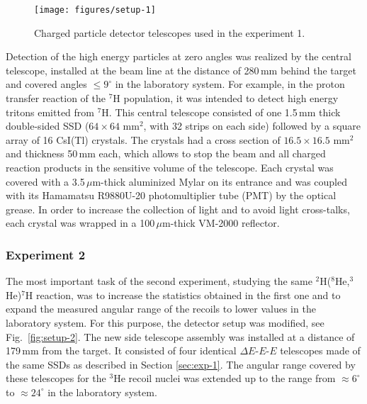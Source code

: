 \begin{figure}
	\begin{center}
		\texttt{[image: figures/setup-1]}
	\end{center}
	\caption{Charged particle detector telescopes used in the experiment 1.}
	\label{fig:setup-1}
\end{figure}

Detection of the high energy particles at zero angles was realized by the central telescope, installed at the beam line at the distance of 280\,mm behind the target and covered angles $\leq9^{\circ}$ in the laboratory system.
For example, in the proton transfer reaction of the $^7$H population, it was intended to detect high energy tritons emitted from $^7$H.
This central telescope consisted of one 1.5\,mm thick double-sided SSD ($64 \times 64$ mm$^2$, with 32 strips on each side) followed by a square array of 16 CsI(Tl) crystals.
The crystals had a cross section of $16.5\times16.5$ mm$^2$ and thickness 50\,mm each, which allows to stop the beam and all charged reaction products in the sensitive volume of the telescope.
Each crystal was covered with a 3.5\,$\mu$m-thick aluminized Mylar on its entrance and was coupled with its Hamamatsu R9880U-20 photomultiplier tube (PMT) by the optical grease.
In order to increase the collection of light and to avoid light cross-talks, each crystal was wrapped in a 100\,$\mu$m-thick VM-2000 reflector.


\subsubsection{Experiment 2}
\label{sec:exp-2}


The most important task of the second experiment, studying the same $^2$H($^8$He,$^3$He)$^7$H reaction, was to increase the statistics obtained in the first one and to expand the measured angular range of the recoils to lower values in the laboratory system.
For this purpose, the detector setup was modified, see Fig.\ \ref{fig:setup-2}.
The new side telescope assembly was installed at a distance of 179\,mm from the target.
It consisted of four identical $\Delta E$-$E$-$E$ telescopes made of the same SSDs as described in Section \ref{sec:exp-1}.
The angular range covered by these telescopes for the $^3$He recoil nuclei was extended up to the range from $\approx 6^{\circ}$ to $\approx 24^{\circ}$ in the laboratory system.

